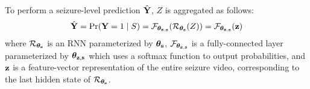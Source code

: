 To perform a seizure-level prediction $\hat{\Yb}$, $Z$ is aggregated as follows:
\begin{equation}
    \hat{\Yb}
    = \Pr(\Yb = 1 \mid S)
    = \Fzs( \Rs ( Z ) )
    = \Fzs( \z )
\end{equation}
where
$\Rs$ is an \ac{RNN} parameterized by $\pars{\sss}$,
$\Fzs$ is a fully-connected layer parameterized by $\pars{\z,\sss}$ which uses a softmax function to output probabilities,
and $\z$ is a feature-vector representation of the entire seizure video, corresponding to the last hidden state of $\Rs$.
